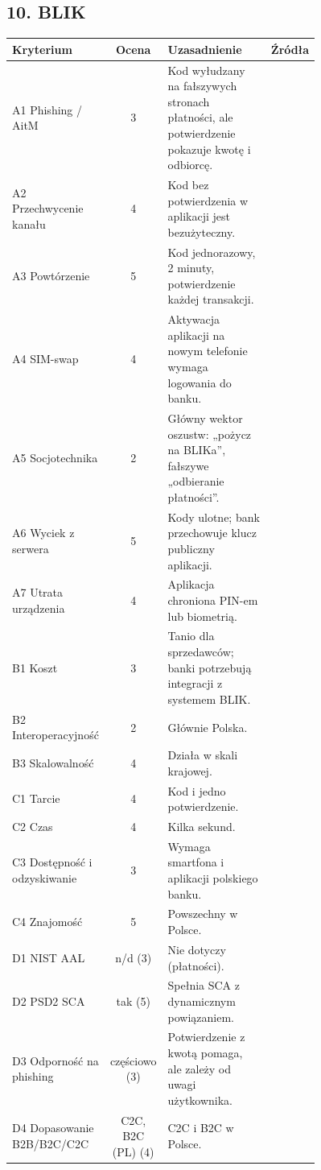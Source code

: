 \subsection*{10. BLIK}
\begingroup\small
\begin{longtable}{@{}p{0.2\linewidth}c p{0.56\linewidth}l@{}}
\toprule
Kryterium & Ocena & Uzasadnienie & Źródła \\
\midrule
\endhead
A1 Phishing / AitM & 3 & Kod wyłudzany na fałszywych stronach płatności, ale potwierdzenie pokazuje kwotę i odbiorcę. & \cite{X7,N3} \\
A2 Przechwycenie kanału & 4 & Kod bez potwierdzenia w aplikacji jest bezużyteczny. & \cite{X7} \\
A3 Powtórzenie & 5 & Kod jednorazowy, 2 minuty, potwierdzenie każdej transakcji. & \cite{X7} \\
A4 SIM-swap & 4 & Aktywacja aplikacji na nowym telefonie wymaga logowania do banku. & \cite{X7,X2} \\
A5 Socjotechnika & 2 & Główny wektor oszustw: „pożycz na BLIKa”, fałszywe „odbieranie płatności”. & \cite{X7,P9} \\
A6 Wyciek z serwera & 5 & Kody ulotne; bank przechowuje klucz publiczny aplikacji. & \cite{X7} \\
A7 Utrata urządzenia & 4 & Aplikacja chroniona PIN-em lub biometrią. & \cite{X7} \\
B1 Koszt & 3 & Tanio dla sprzedawców; banki potrzebują integracji z systemem BLIK. & \cite{X7} \\
B2 Interoperacyjność & 2 & Głównie Polska. & \cite{X7} \\
B3 Skalowalność & 4 & Działa w skali krajowej. & \cite{X7} \\
C1 Tarcie & 4 & Kod i jedno potwierdzenie. & \cite{X7} \\
C2 Czas & 4 & Kilka sekund. & \cite{X7} \\
C3 Dostępność i odzyskiwanie & 3 & Wymaga smartfona i aplikacji polskiego banku. & \cite{X7} \\
C4 Znajomość & 5 & Powszechny w Polsce. & \cite{X7} \\
D1 NIST AAL & n/d (3) & Nie dotyczy (płatności). & \cite{N1} \\
D2 PSD2 SCA & tak (5) & Spełnia SCA z dynamicznym powiązaniem. & \cite{N3,X7} \\
D3 Odporność na phishing & częściowo (3) & Potwierdzenie z kwotą pomaga, ale zależy od uwagi użytkownika. & \cite{X7} \\
D4 Dopasowanie B2B/B2C/C2C & C2C, B2C (PL) (4) & C2C i B2C w Polsce. & \cite{X7} \\
\bottomrule
\end{longtable}
\endgroup
